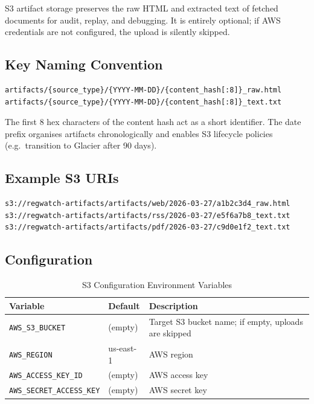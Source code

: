 \documentclass[12pt,a4paper]{article}
\begin{document}
S3 artifact storage preserves the raw HTML and extracted text of fetched documents for audit, replay, and debugging. It is entirely optional; if AWS credentials are not configured, the upload is silently skipped.

\subsection{Key Naming Convention}

\begin{verbatim}
artifacts/{source_type}/{YYYY-MM-DD}/{content_hash[:8]}_raw.html
artifacts/{source_type}/{YYYY-MM-DD}/{content_hash[:8]}_text.txt
\end{verbatim}

The first 8 hex characters of the content hash act as a short identifier. The date prefix organises artifacts chronologically and enables S3 lifecycle policies (e.g.\ transition to Glacier after 90 days).

\subsection{Example S3 URIs}

\begin{lstlisting}[style=shellstyle]
s3://regwatch-artifacts/artifacts/web/2026-03-27/a1b2c3d4_raw.html
s3://regwatch-artifacts/artifacts/rss/2026-03-27/e5f6a7b8_text.txt
s3://regwatch-artifacts/artifacts/pdf/2026-03-27/c9d0e1f2_text.txt
\end{lstlisting}

\subsection{Configuration}

\begin{table}[H]
\centering
\caption{S3 Configuration Environment Variables}\label{tab:s3env}
\begin{tabularx}{\textwidth}{@{}l l X@{}}
\toprule
\textbf{Variable} & \textbf{Default} & \textbf{Description} \\
\midrule
\texttt{AWS\_S3\_BUCKET}          & (empty) & Target S3 bucket name; if empty, uploads are skipped \\
\texttt{AWS\_REGION}              & us-east-1 & AWS region \\
\texttt{AWS\_ACCESS\_KEY\_ID}     & (empty) & AWS access key \\
\texttt{AWS\_SECRET\_ACCESS\_KEY} & (empty) & AWS secret key \\
\bottomrule
\end{tabularx}
\end{table}
\end{document}
